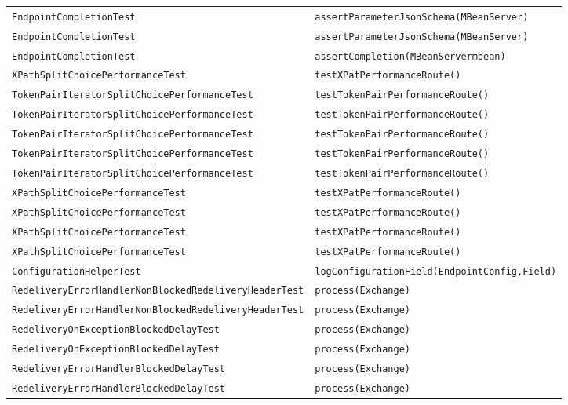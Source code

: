 \begin{center}
\begin{longtable}{ll}
\lstinline/EndpointCompletionTest/&{\lstinline/assertParameterJsonSchema(MBeanServer)/}\\
\lstinline/EndpointCompletionTest/&{\lstinline/assertParameterJsonSchema(MBeanServer)/}\\
\lstinline/EndpointCompletionTest/&{\lstinline/assertCompletion(MBeanServermbean)/}\\
\lstinline/XPathSplitChoicePerformanceTest/&{\lstinline/testXPatPerformanceRoute()/}\\
\lstinline/TokenPairIteratorSplitChoicePerformanceTest/&{\lstinline/testTokenPairPerformanceRoute()/}\\
\lstinline/TokenPairIteratorSplitChoicePerformanceTest/&{\lstinline/testTokenPairPerformanceRoute()/}\\
\lstinline/TokenPairIteratorSplitChoicePerformanceTest/&{\lstinline/testTokenPairPerformanceRoute()/}\\
\lstinline/TokenPairIteratorSplitChoicePerformanceTest/&{\lstinline/testTokenPairPerformanceRoute()/}\\
\lstinline/TokenPairIteratorSplitChoicePerformanceTest/&{\lstinline/testTokenPairPerformanceRoute()/}\\
\lstinline/XPathSplitChoicePerformanceTest/&{\lstinline/testXPatPerformanceRoute()/}\\
\lstinline/XPathSplitChoicePerformanceTest/&{\lstinline/testXPatPerformanceRoute()/}\\
\lstinline/XPathSplitChoicePerformanceTest/&{\lstinline/testXPatPerformanceRoute()/}\\
\lstinline/XPathSplitChoicePerformanceTest/&{\lstinline/testXPatPerformanceRoute()/}\\
\lstinline/ConfigurationHelperTest/&{\lstinline/logConfigurationField(EndpointConfig,Field)/}\\
\lstinline/RedeliveryErrorHandlerNonBlockedRedeliveryHeaderTest/&{\lstinline/process(Exchange)/}\\
\lstinline/RedeliveryErrorHandlerNonBlockedRedeliveryHeaderTest/&{\lstinline/process(Exchange)/}\\
\lstinline/RedeliveryOnExceptionBlockedDelayTest/&{\lstinline/process(Exchange)/}\\
\lstinline/RedeliveryOnExceptionBlockedDelayTest/&{\lstinline/process(Exchange)/}\\
\lstinline/RedeliveryErrorHandlerBlockedDelayTest/&{\lstinline/process(Exchange)/}\\
\lstinline/RedeliveryErrorHandlerBlockedDelayTest/&{\lstinline/process(Exchange)/}\\

\end{longtable}
\end{center}
